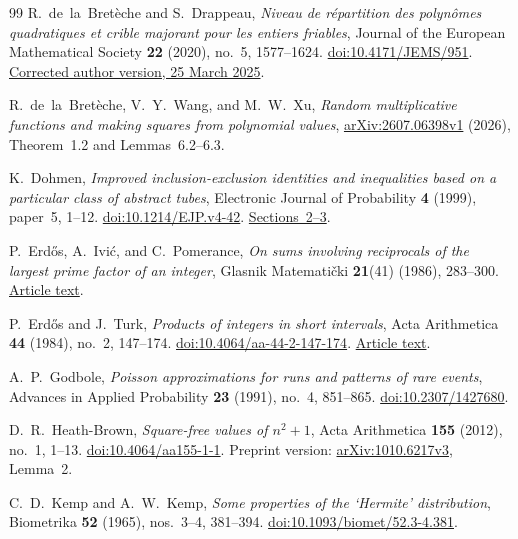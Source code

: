 \begin{thebibliography}{99}
R.~de~la~Bret\`eche and S.~Drappeau,
\emph{Niveau de r\'epartition des polyn\^omes quadratiques
et crible majorant pour les entiers friables},
Journal of the European Mathematical Society \textbf{22}
(2020), no.~5, 1577--1624.
\href{https://doi.org/10.4171/JEMS/951}
{doi:10.4171/JEMS/951}.
\href{https://drappeau.perso.math.cnrs.fr/documents/friable-consec-jems-prefinal-fix1.pdf}
{Corrected author version, 25 March 2025}.

R.~de~la~Bret\`eche, V.~Y.~Wang, and M.~W.~Xu,
\emph{Random multiplicative functions and making squares from
polynomial values},
\href{https://arxiv.org/abs/2607.06398v1}
{arXiv:2607.06398v1} (2026), Theorem~1.2 and
Lemmas~6.2--6.3.

K.~Dohmen,
\emph{Improved inclusion-exclusion identities and inequalities
based on a particular class of abstract tubes},
Electronic Journal of Probability \textbf{4} (1999), paper~5,
1--12.
\href{https://doi.org/10.1214/EJP.v4-42}
{doi:10.1214/EJP.v4-42}.
\href{https://www.maths.tcd.ie/EMIS/journals/EJP-ECP/article/download/42/42-83-1-PB.pdf}
{Sections~2--3}.

P.~Erd\H{o}s, A.~Ivi\'c, and C.~Pomerance,
\emph{On sums involving reciprocals of the largest
prime factor of an integer},
Glasnik Matemati\v{c}ki \textbf{21}(41) (1986), 283--300.
\href{https://www.renyi.hu/~p_erdos/1986-10.pdf}
{Article text}.

P.~Erd\H{o}s and J.~Turk,
\emph{Products of integers in short intervals},
Acta Arithmetica \textbf{44} (1984), no.~2, 147--174.
\href{https://doi.org/10.4064/aa-44-2-147-174}
{doi:10.4064/aa-44-2-147-174}.
\href{https://www.renyi.hu/~p_erdos/1984-17.pdf}
{Article text}.

A.~P.~Godbole,
\emph{Poisson approximations for runs and patterns of rare events},
Advances in Applied Probability \textbf{23} (1991), no.~4,
851--865.
\href{https://doi.org/10.2307/1427680}
{doi:10.2307/1427680}.

D.~R.~Heath-Brown,
\emph{Square-free values of \(n^2+1\)},
Acta Arithmetica \textbf{155} (2012), no.~1, 1--13.
\href{https://doi.org/10.4064/aa155-1-1}
{doi:10.4064/aa155-1-1}.
Preprint version:
\href{https://arxiv.org/abs/1010.6217v3}
{arXiv:1010.6217v3}, Lemma~2.

C.~D.~Kemp and A.~W.~Kemp,
\emph{Some properties of the `Hermite' distribution},
Biometrika \textbf{52} (1965), nos.~3--4, 381--394.
\href{https://doi.org/10.1093/biomet/52.3-4.381}
{doi:10.1093/biomet/52.3-4.381}.


\end{thebibliography}
